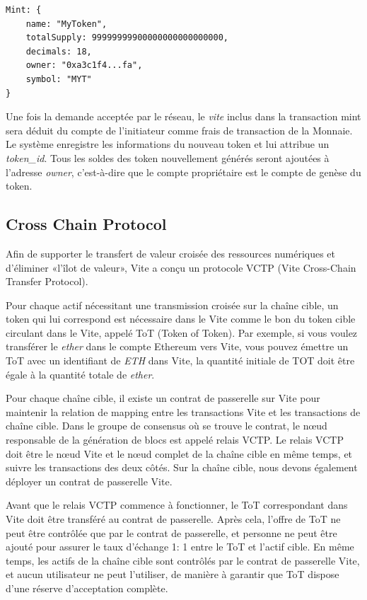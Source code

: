 \documentclass[UTF8,nofonts]{article}
\begin{document}
\begin{multicols}{2}
\begin{verbatim}
Mint: {
    name: "MyToken",
   	totalSupply: 99999999900000000000000000,
   	decimals: 18,
   	owner: "0xa3c1f4...fa",
    symbol: "MYT"
}
\end{verbatim}

Une fois la demande acceptée par le réseau, le \textit{vite} inclus dans la transaction mint sera déduit du compte de l'initiateur comme frais de transaction de la Monnaie. Le système enregistre les informations du nouveau token et lui attribue un \textit{token\_id}. Tous les soldes des token nouvellement générés seront ajoutées à l'adresse \textit{owner}, c'est-à-dire que le compte propriétaire est le compte de genèse du token.

\subsection{Cross Chain Protocol}
Afin de supporter le transfert de valeur croisée des ressources numériques et d'éliminer «l'îlot de valeur», Vite a conçu un protocole VCTP (Vite Cross-Chain Transfer Protocol).

Pour chaque actif nécessitant une transmission croisée sur la chaîne cible, un token qui lui correspond est nécessaire dans le Vite comme le bon du token cible circulant dans le Vite, appelé ToT (Token of Token). Par exemple, si vous voulez transférer le \textit{ether} dans le compte Ethereum vers Vite, vous pouvez émettre un ToT avec un identifiant de \textit{ETH} dans Vite, la quantité initiale de TOT doit être égale à la quantité totale de \textit{ether}.

Pour chaque chaîne cible, il existe un contrat de passerelle sur Vite pour maintenir la relation de mapping entre les transactions Vite et les transactions de chaîne cible. Dans le groupe de consensus où se trouve le contrat, le nœud responsable de la génération de blocs est appelé relais VCTP. Le relais VCTP doit être le nœud Vite et le nœud complet de la chaîne cible en même temps, et suivre les transactions des deux côtés. Sur la chaîne cible, nous devons également déployer un contrat de passerelle Vite.

Avant que le relais VCTP commence à fonctionner, le ToT correspondant dans Vite doit être transféré au contrat de passerelle. Après cela, l'offre de ToT ne peut être contrôlée que par le contrat de passerelle, et personne ne peut être ajouté pour assurer le taux d'échange 1: 1 entre le ToT et l'actif cible. En même temps, les actifs de la chaîne cible sont contrôlés par le contrat de passerelle Vite, et aucun utilisateur ne peut l'utiliser, de manière à garantir que ToT dispose d'une réserve d'acceptation complète.


\end{multicols}
\end{document}
